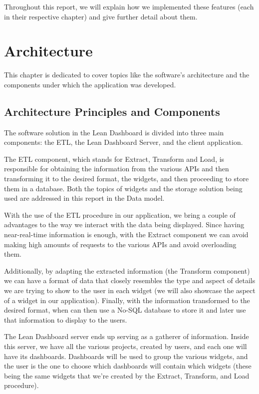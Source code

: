 \documentclass[a4paper,twoside,10pt]{report}
\begin{document}
Throughout this report, we will explain how we implemented these features (each in their respective chapter) and give further detail about them.

\chapter{Architecture}
This chapter is dedicated to cover topics like the software's architecture and the components under which the application was developed. 

\section{Architecture Principles and Components}
The software solution in the Lean Dashboard is divided into three main components: the ETL\cite{ETLPROC}, the Lean Dashboard Server, and the client application.
 
The ETL component, which stands for Extract, Transform and Load, is responsible for obtaining the information from the various APIs and then transforming it to the desired format, the widgets, and then proceeding to store them in a database. Both the topics of widgets and the storage solution being used are addressed in this report in the Data model.
 
With the use of the ETL procedure in our application, we bring a couple of advantages to the way we interact with the data being displayed. Since having near-real-time information is enough, with the Extract component we can avoid making high amounts of requests to the various APIs and avoid overloading them.
 
Additionally, by adapting the extracted information (the Transform component) we can have a format of data that closely resembles the type and aspect of details we are trying to show to the user in each widget (we will also showcase the aspect of a widget in our application). Finally, with the information transformed to the desired format, when can then use a No-SQL database to store it and later use that information to display to the users.
 
The Lean Dashboard server ends up serving as a gatherer of information. Inside this server, we have all the various projects, created by users, and each one will have its dashboards. Dashboards will be used to group the various widgets, and the user is the one to choose which dashboards will contain which widgets (these being the same widgets that we're created by the Extract, Transform, and Load procedure).
 
\end{document}
